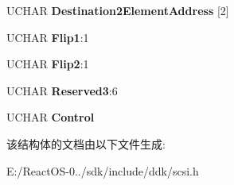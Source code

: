 \begin{DoxyCompactItemize}
\item 
\mbox{\label{struct___c_d_b_1_1___e_x_c_h_a_n_g_e___m_e_d_i_u_m_a0cdf4e65e14dd576b42df813c1c0e9a3}} 
U\+C\+H\+AR {\bfseries Destination2\+Element\+Address} \mbox{[}2\mbox{]}
\item 
\mbox{\label{struct___c_d_b_1_1___e_x_c_h_a_n_g_e___m_e_d_i_u_m_ab8e7148790b51265f4db320b52fbff66}} 
U\+C\+H\+AR {\bfseries Flip1}\+:1
\item 
\mbox{\label{struct___c_d_b_1_1___e_x_c_h_a_n_g_e___m_e_d_i_u_m_a346a0b0e4bdd3a6f3a46decb23188c63}} 
U\+C\+H\+AR {\bfseries Flip2}\+:1
\item 
\mbox{\label{struct___c_d_b_1_1___e_x_c_h_a_n_g_e___m_e_d_i_u_m_aba7116048b8e09b86f03955394681292}} 
U\+C\+H\+AR {\bfseries Reserved3}\+:6
\item 
\mbox{\label{struct___c_d_b_1_1___e_x_c_h_a_n_g_e___m_e_d_i_u_m_ade18c1586f6c25b1c71e2ca0182a2115}} 
U\+C\+H\+AR {\bfseries Control}
\end{DoxyCompactItemize}


该结构体的文档由以下文件生成\+:\begin{DoxyCompactItemize}
\item 
E\+:/\+React\+O\+S-\/0../sdk/include/ddk/scsi.\+h\end{DoxyCompactItemize}
